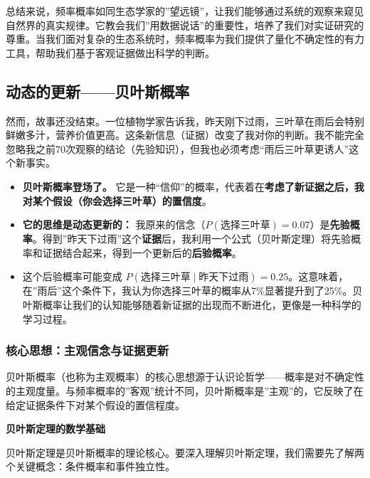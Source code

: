 \documentclass[
  twoside]{book}
\providecommand{\tightlist}{%
  \setlength{\itemsep}{0pt}\setlength{\parskip}{0pt}}
\begin{document}
总结来说，频率概率如同生态学家的''望远镜''，让我们能够通过系统的观察来窥见自然界的真实规律。它教会我们''用数据说话''的重要性，培养了我们对实证研究的尊重。当我们面对复杂的生态系统时，频率概率为我们提供了量化不确定性的有力工具，帮助我们基于客观证据做出科学的判断。

\hypertarget{ux52a8ux6001ux7684ux66f4ux65b0ux8d1dux53f6ux65afux6982ux7387}{%
\subsection{动态的更新------贝叶斯概率}\label{ux52a8ux6001ux7684ux66f4ux65b0ux8d1dux53f6ux65afux6982ux7387}}

然而，故事还没结束。一位植物学家告诉我，昨天刚下过雨，三叶草在雨后会特别鲜嫩多汁，营养价值更高。这条新信息（证据）改变了我对你的判断。我不能完全忽略我之前70次观察的结论（先验知识），但我也必须考虑``雨后三叶草更诱人''这个新事实。

\begin{itemize}
\tightlist
\item
  \textbf{贝叶斯概率登场了。} 它是一种``信仰''的概率，代表着在\textbf{考虑了新证据之后，我对某个假设（你会选择三叶草）的置信度}。
\item
  \textbf{它的思维是动态更新的：} 我原来的信念（\(P(\text{选择三叶草}) = 0.07\)）是\textbf{先验概率}。得到''昨天下过雨''这个\textbf{证据}后，我利用一个公式（贝叶斯定理）将先验概率和证据结合起来，得到一个更新后的\textbf{后验概率}。
\item
  这个后验概率可能变成 \(P(\text{选择三叶草} \mid \text{昨天下过雨}) = 0.25\)。这意味着，在''雨后''这个条件下，我认为你选择三叶草的概率从7\%显著提升到了25\%。贝叶斯概率让我们的认知能够随着新证据的出现而不断进化，更像是一种科学的学习过程。
\end{itemize}

\hypertarget{ux6838ux5fc3ux601dux60f3ux4e3bux89c2ux4fe1ux5ff5ux4e0eux8bc1ux636eux66f4ux65b0}{%
\subsubsection{核心思想：主观信念与证据更新}\label{ux6838ux5fc3ux601dux60f3ux4e3bux89c2ux4fe1ux5ff5ux4e0eux8bc1ux636eux66f4ux65b0}}

贝叶斯概率（也称为主观概率）的核心思想源于认识论哲学------概率是对不确定性的主观度量。与频率概率的''客观''统计不同，贝叶斯概率是''主观''的，它反映了在给定证据条件下对某个假设的置信程度。

\textbf{贝叶斯定理的数学基础}

贝叶斯定理是贝叶斯概率的理论核心。要深入理解贝叶斯定理，我们需要先了解两个关键概念：条件概率和事件独立性。
\end{document}
